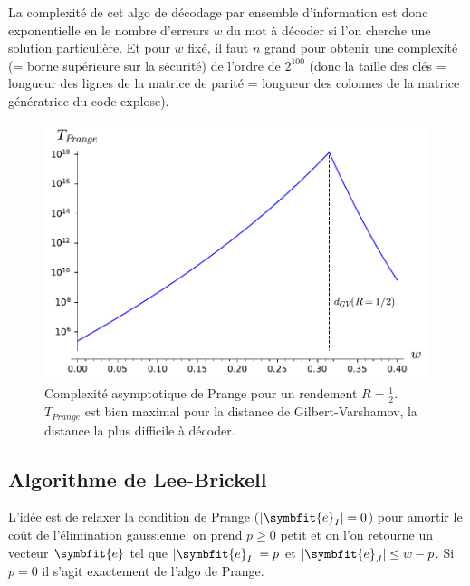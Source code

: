 \documentclass[a4paper,11pt,headings=small,footinclude=false]{scrartcl}
\theoremstyle{definition}
\theoremstyle{remark}
\begin{document}
La complexité de cet algo de décodage par ensemble d'information est donc exponentielle en le nombre d'erreurs $w$ du mot à décoder si l'on cherche une solution particulière. Et pour $w$ fixé, il faut $n$ grand pour obtenir une complexité (= borne supérieure sur la sécurité) de l'ordre de $2^{100}$ (donc la taille des clés = longueur des lignes de la matrice de parité = longueur des colonnes de la matrice génératrice du code explose).

\begin{figure}[h]
\centering
\includegraphics{decodage_syndrome/prange.pdf}
\caption{Complexité asymptotique de Prange pour un rendement $R=\frac{1}{2}$. $T_{Prange}$ est bien maximal pour la distance de Gilbert-Varshamov, la distance la plus difficile à décoder.}
\label{fig:prange}
\end{figure}


\subsection{Algorithme de Lee-Brickell}

L'idée est de relaxer la condition de Prange ($|\symbfit{e}_I|=0$) pour amortir le coût de l'élimination gaussienne: on prend $p\geq 0$ petit et on l'on retourne un vecteur $\symbfit{e}$ tel que $|\symbfit{e}_I|=p$ et $|\symbfit{e}_J|\leq w-p$. Si $p=0$ il s'agit exactement de l'algo de Prange.
\end{document}
